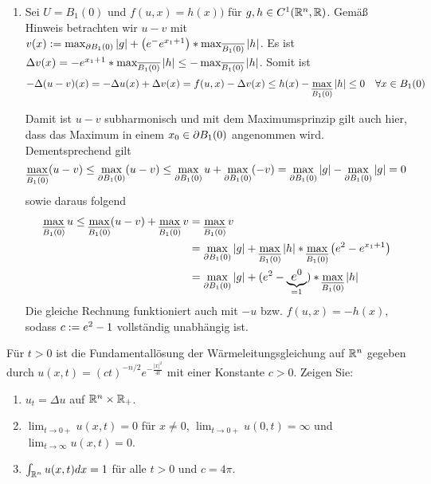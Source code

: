 \begin{exercisePage}
\begin{enumerate}[label=(zu \alph*), leftmargin=*]
		\item Sei $U = B_1(0)$ und $f(u,x) = h(x))$ für $g,h \in C^1(\mathbb{R}^n,\mathbb{R})$. Gemäß Hinweis betrachten wir $u-v$ mit $v(x) \mathrel{:=} \max_{\partial B_1(0)} \left| g \right| + \left( e^- e^{x_1 + 1} \right) * \max_{\overline{B_1(0)}} \left| h \right|$. Es ist $\Delta v(x) = -e^{x_1 + 1} * \max_{\overline{B_1(0)}} \left| h \right| \le - \max_{\overline{B_1(0)}} \left| h \right|$. Somit ist
		\begin{equation*}
			- \Delta (u-v) (x) = - \Delta u(x) + \Delta v(x) = f(u,x) - \Delta v(x) \le h(x) - \max_{\overline{B_1(0)}} \left| h \right| \le 0 \quad \forall x \in B_1(0)
		\end{equation*}
		
		Damit ist $u-v$ subharmonisch und mit dem Maximumsprinzip gilt auch hier, dass das Maximum in einem $x_0 \in \partial B_1(0)$ angenommen wird. Dementsprechend gilt
		\begin{equation*}
			\max_{\overline{B_1(0)}} (u-v) \le \max_{\partial B_1(0)} (u-v) \le \max_{\partial B_1(0)} u + \max_{\partial B_1(0)} (-v) = \max_{\partial B_1(0)} \left| g \right| - \max_{\partial B_1(0)} \left| g \right| = 0
		\end{equation*}
		sowie daraus folgend
		\begin{equation*}
			\begin{aligned}
				\max_{\overline{B_1(0)}} u 
				\le \max_{\overline{B_1(0)}}(u-v) + \max_{\overline{B_1(0)}} v 
				&= \max_{\overline{B_1(0)}} v \\
				&= \max_{\partial B_1(0)} \left| g \right| + \max_{\overline{B_1(0)}} \left| h \right| * \max_{\overline{B_1(0)}} \left( e^2 - e^{x_1 + 1} \right) \\
				&= \max_{\partial B_1(0)} \left| g \right| + \large( e^2 - \underbrace{e^0}_{=1} \large) * \max_{\overline{B_1(0)}} \left| h \right|
			\end{aligned}
		\end{equation*}
		Die gleiche Rechnung funktioniert auch mit $-u$ bzw. $f(u,x) = -h(x)$, sodass $c \mathrel{:=} e^2 - 1$ vollständig unabhängig ist.
		
	\end{enumerate} 
	
	\begin{task}
		Für $t>0$ ist die Fundamentallösung der Wärmeleitungsgleichung auf $\mathbb{R}^n$ gegeben durch $u(x,t) = (c t)^{-n/2} e^{-\frac{|x|^2}{4t}}$ mit einer Konstante $c>0$. Zeigen Sie:
		\begin{enumerate}
			\item $u_t = \Delta u$ auf $\mathbb{R}^n \times \mathbb{R}_+$.
			\item $\lim_{t\to 0+} u(x,t)= 0$ für $x\neq 0$, $\lim_{t\to 0+} u(0,t) = \infty$ und $\lim_{t\to\infty} u(x,t)=0$.
			\item $\int_{\mathbb{R}^n} u(x,t)dx = 1$ für alle $t>0$ und $c= 4\pi$.
		\end{enumerate}
	\end{task}
\end{exercisePage}